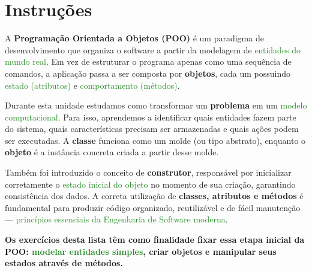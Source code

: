 \documentclass[12pt]{article}
\begin{document}
\vspace*{0.2cm}

\section*{Instruções}
  
   A \textbf{Programação Orientada a Objetos (POO)} é um paradigma de desenvolvimento que organiza o software a partir da modelagem de \textcolor{forestgreen}{entidades do mundo real}. Em vez de estruturar o programa apenas como uma sequência de comandos, a aplicação passa a ser composta por \textbf{objetos}, cada um possuindo \textcolor{forestgreen}{estado (atributos)} e \textcolor{forestgreen}{comportamento (métodos)}.

Durante esta unidade estudamos como transformar um \textbf{problema} em um \textcolor{forestgreen}{modelo computacional}. Para isso, aprendemos a identificar quais entidades fazem parte do sistema, quais características precisam ser armazenadas e quais ações podem ser executadas. A \textbf{classe} funciona como um molde (ou tipo abstrato), enquanto o \textbf{objeto} é a instância concreta criada a partir desse molde.

Também foi introduzido o conceito de \textbf{construtor}, responsável por inicializar corretamente o \textcolor{forestgreen}{estado inicial do objeto} no momento de sua criação, garantindo consistência dos dados. A correta utilização de \textbf{classes, atributos e métodos} é fundamental para produzir código organizado, reutilizável e de fácil manutenção --- \textcolor{forestgreen}{princípios essenciais da Engenharia de Software moderna}.

\textbf{Os exercícios desta lista têm como finalidade fixar essa etapa inicial da POO: \textcolor{forestgreen}{modelar entidades simples}, criar objetos e manipular seus estados através de métodos.}
\end{document}
